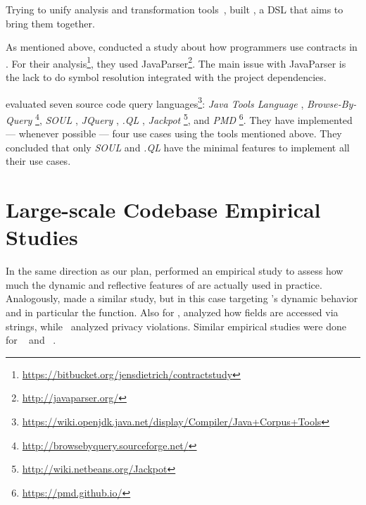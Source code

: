 Trying to unify analysis and transformation tools~\cite{vinjuHowMakeBridge2006}, \cite{klintRASCALDomainSpecific2009} built \rascal, a DSL that aims to bring them together.

As mentioned above,
\cite{dietrichContractsWildStudy2017a} conducted a study about how programmers use contracts in \mavencentral{}.
For their analysis\footnote{\url{https://bitbucket.org/jensdietrich/contractstudy}},
they used JavaParser\footnote{\url{http://javaparser.org/}}.
The main issue with JavaParser is the lack to do symbol resolution integrated with the project dependencies.

\cite{urmaProgrammingLanguageEvolution2012} evaluated seven source code query languages\footnote{\url{https://wiki.openjdk.java.net/display/Compiler/Java+Corpus+Tools}}:
\emph{Java Tools Language} \cite{cohenJTLJavaTools},
\emph{Browse-By-Query} \footnote{\url{http://browsebyquery.sourceforge.net/}},
\emph{SOUL} \cite{derooverSOULToolSuite2011},
\emph{JQuery} \cite{volderJqueryGenericCode2006},
\emph{.QL} \cite{moorKeynoteAddressQL2007} ,
\emph{Jackpot} \footnote{\url{http://wiki.netbeans.org/Jackpot}}, and
\emph{PMD} \footnote{\url{https://pmd.github.io/}}.
They have implemented --- whenever possible --- four use cases using the tools mentioned above.
They concluded that only \emph{SOUL} and \emph{.QL} have the minimal features to implement all their use cases.


\section{Large-scale Codebase Empirical Studies}
\label{sec:lr:largescale}

In the same direction as our plan, \cite{callauHowWhyDevelopers2013} performed an empirical study to assess how much the dynamic and reflective features of \smalltalk{} are actually used in practice.
Analogously, \cite{richardsAnalysisDynamicBehavior2010,richardsEvalThatMen2011} made a similar study, but in this case targeting \javascript{}'s dynamic behavior and in particular the  function. 
Also for \javascript{}, \cite{madsenStringAnalysisDynamic2014} analyzed how fields are accessed via strings, while~\cite{jangEmpiricalStudyPrivacyviolating2010} analyzed privacy violations. 
Similar empirical studies were done for \php{}~\cite{hillsEmpiricalStudyPHP2013,dahseExperienceReportEmpirical2015,doyleEmpiricalStudyEvolution2011} and \swift{}~\cite{reboucasEmpiricalStudyUsage2016}.  

